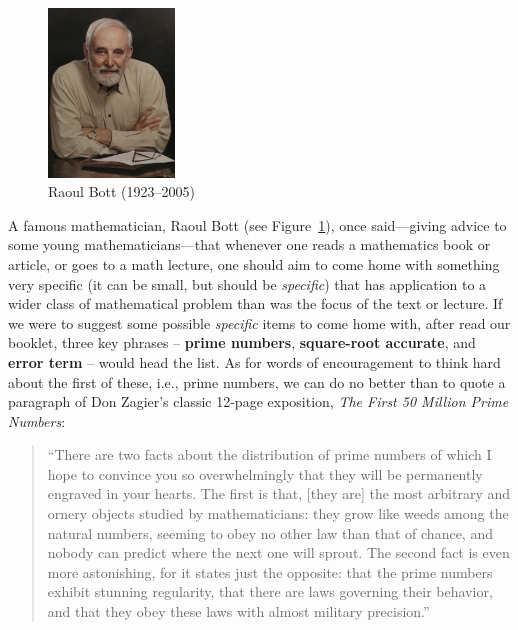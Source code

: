 \documentclass[11pt]{article}
\theoremstyle{plain}
\theoremstyle{definition}
\numberwithin{equation}{section}
\numberwithin{figure}{section}
\numberwithin{table}{section}
\begin{document}
\begin{figure}[ht]\label{fig:bott}
\begin{center}
\includegraphics[width=0.3\textwidth]{illustrations/raoulbott}
\caption{Raoul Bott (1923--2005)}
\end{center}
\end{figure}

A famous mathematician, Raoul Bott (see Figure~\ref{fig:bott}), once
said---giving advice to some young mathematicians---that whenever one
reads a mathematics book or article, or goes to a math lecture, one
should aim to come home with something very specific (it can be small,
but should be {\em specific}) that has application to a wider class of
mathematical problem than was the focus of the text or lecture.  If we
were to suggest some possible {\em specific} items to come home with,
after read our booklet, three key phrases -- {\bf prime numbers}, {\bf
  square-root accurate}, and {\bf error term} -- would head the
list. As for words of encouragement to think hard about the first of
these, i.e., prime numbers, we can do no better than to quote a
paragraph of Don Zagier's classic 12-page exposition, {\em The First
  50 Million Prime Numbers}:
    
\begin{quote}                      
  ``There are two facts about the distribution of prime numbers of
  which I hope to convince you so overwhelmingly that they will be
  permanently engraved in your hearts. The first is that, [they are]
  the most arbitrary and ornery objects studied by mathematicians:
  they grow like weeds among the natural numbers, seeming to obey no
  other law than that of chance, and nobody can predict where the next
  one will sprout. The second fact is even more astonishing, for it
  states just the opposite: that the prime numbers exhibit stunning
  regularity, that there are laws governing their behavior, and that
  they obey these laws with almost military precision.''
\end{quote}
                    
\end{document}
